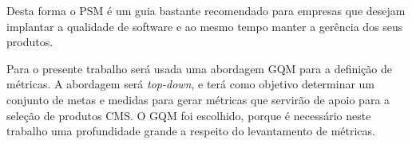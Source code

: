 Desta forma o PSM é um guia bastante recomendado para empresas que desejam implantar a qualidade de software e ao mesmo tempo manter a gerência dos seus produtos.



Para o presente trabalho será usada uma abordagem GQM para a definição de métricas. A abordagem será  \textit{top-down}, e terá como objetivo determinar um conjunto de metas e medidas para gerar métricas que servirão de apoio para a seleção de produtos CMS. O GQM foi escolhido, porque é necessário neste trabalho uma profundidade grande a respeito do levantamento de métricas.


